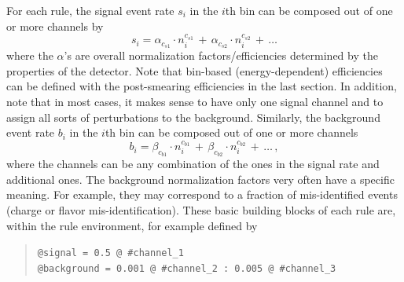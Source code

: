 For each rule, the signal event rate $s_i$ in the $i$th bin can be composed 
out of one or more channels by 
\begin{equation}
s_i=\alpha_{c_{s1}}\cdot n_i^{c_{s1}}\,+\,\alpha_{c_{s2}}\cdot n_i^{c_{s2}}\,+\,\ldots
\end{equation}
where the $\alpha$'s are overall normalization factors/efficiencies
 determined by the properties of the detector. Note that bin-based (energy-dependent) efficiencies can be defined with the post-smearing efficiencies in the last section. 
In addition, note that in most cases, it makes sense to have only one 
signal channel and to assign all sorts of perturbations to the background. 
%
Similarly, the background event rate $b_i$ in the $i$th bin can be composed
out of one or more channels
\begin{equation}
b_i=\beta_{c_{b1}}\cdot n_i^{c_{b1}}\,+\,\beta_{c_{b2}}\cdot n_i^{c_{b2}}\,+\,\ldots \, ,
\end{equation}
where the channels can be any combination of the ones in the signal rate and 
additional ones. The background normalization factors very often have
a specific meaning. For example, they may correspond to a fraction
of mis-identified events (charge or flavor mis-identification).
%
%
These basic building blocks of each rule are, within the rule environment,
for example defined by
\begin{quote}
{\tt \tb @signal = 0.5 @ \#channel\_1\\
\tb @background = 0.001 @ \#channel\_2 :  0.005 @ \#channel\_3
}
\end{quote}

